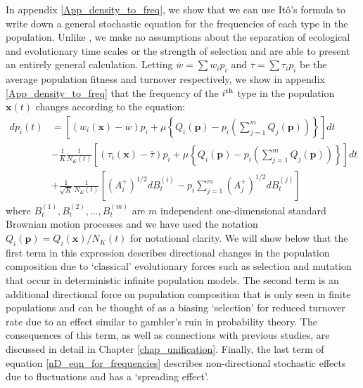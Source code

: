 In appendix \ref{App_density_to_freq}, we show that we can use It\^{o}'s formula to write  down a general stochastic equation for the frequencies of each type in the population. Unlike \citep{mcleod_social_2019}, we make no assumptions about the separation of ecological and evolutionary time scales or the strength of selection and are able to present an entirely general calculation.  Letting $\overline{w} = \sum w_ip_i$ and $\overline{\tau} = \sum \tau_i p_i$ be the average population fitness and turnover respectively, we show in appendix \ref{App_density_to_freq} that the frequency of the $i\textsuperscript{th}$ type in the population $\mathbf{x}(t)$ changes according to the equation:
\begin{equation}
\label{nD_eqn_for_frequencies}
\begin{aligned}
dp_i(t) &= \left[(w_i(\mathbf{x}) - \overline{w})p_i + \mu\left\{Q_i(\mathbf{p}) - p_i\left(\sum\limits_{j=1}^{m}Q_j(\mathbf{p})\right)\right\}\right]dt\\
&- \frac{1}{K}\frac{1}{N_{K}(t)}\left[(\tau_i(\mathbf{x}) - \overline{\tau})p_i + \mu\left\{Q_i(\mathbf{p}) - p_i\left(\sum\limits_{j=1}^{m}Q_j(\mathbf{p})\right)\right\}\right]dt\\
&+ \frac{1}{\sqrt{K}}\frac{1}{N_{K}(t)}\left[\left(A^{+}_{i}\right)^{1/2}dB^{(i)}_t - p_i\sum\limits_{j=1}^{m}\left(A^{+}_{j}\right)^{1/2}dB^{(j)}_t\right]
\end{aligned}
\end{equation}
where $B^{(1)}_t,B^{(2)}_t, \ldots, B^{(m)}_t$ are $m$ independent one-dimensional standard Brownian motion processes and we have used the notation $Q_i(\mathbf{p}) = Q_i(\mathbf{x})/N_K(t)$ for notational clarity. We will show below that the first term in this expression describes directional changes in the population composition due to `classical' evolutionary forces such as selection and mutation that occur in deterministic infinite population models. The second term is an additional directional force on population composition that is only seen in finite populations and can be thought of as a biasing `selection' for reduced turnover rate due to an effect similar to gambler's ruin in probability theory. The consequences of this term, as well as connections with previous studies, are discussed in detail in Chapter \ref{chap_unification}. Finally, the last term of equation \eqref{nD_eqn_for_frequencies} describes non-directional stochastic effects due to fluctuations and has a `spreading effect'.

